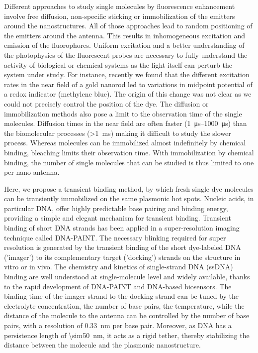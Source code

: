 Different approaches to study single molecules by fluorescence enhancement involve free diffusion, non-specific sticking or immobilization of the emitters around the nanostructures. All of those approaches lead to random positioning of the emitters around the antenna.\cite{pradhan2016goldnanorodenhanced,yuan2013thousandfold,zhang2017gold}
This results in inhomogeneous excitation and emission of the fluorophores.
Uniform excitation and a better understanding of the photophysics of the fluorescent probes are necessary to fully understand the activity of biological or chemical systems as the light itself can perturb the system under study.
For instance, recently we found that the different excitation rates in the near field of a gold nanorod led to variations in midpoint potential of a redox indicator (methylene blue). The origin of this change was not clear as we could not precisely control the position of the dye.\cite{zhang2017gold}
The diffusion or immobilization methods also pose a limit to the observation time of the single molecules.
Diffusion times in the near field are often faster (\SIrange{1}{1000}{\us}) than the biomolecular processes (\SI{>1}{\ms}) making it difficult to study the slower process.
Whereas molecules can be immobilized almost indefinitely by chemical binding, bleaching limits their observation time. With immobilization by chemical binding, the number of single molecules that can be studied is thus limited to one per nano-antenna.


Here, we propose a transient binding method, by which fresh single dye molecules can be transiently immobilized on the same plasmonic hot spots. Nucleic acids, in particular DNA, offer highly predictable base pairing and binding energy, providing a simple and elegant mechanism for transient binding. Transient binding of short DNA strands has been applied in a super-resolution imaging technique called DNA-PAINT.\cite{jungmann2010singlemolecule,lin2012submicrometre,schnitzbauer2017superresolution}
The necessary blinking required for super resolution is generated by the transient binding of the short dye-labeled DNA ('imager') to its complementary target ('docking') strands on the structure in vitro or in vivo.
The chemistry and kinetics of single-strand DNA (ssDNA) binding are well understood at single-molecule level and widely available, thanks to the rapid development of DNA-PAINT and DNA-based biosensors.\cite{sassolas2008dna,jungmann2010singlemolecule}
The binding time of the imager strand to the docking strand can be tuned by the electrolyte concentration, the number of base pairs, the temperature, while the distance of the molecule to the antenna can be controlled by the number of base pairs, with a resolution of \SI{0.33}{\nm} per base pair.
Moreover, as DNA has a persistence length of \SI{\sim50}{\nm}, it acts as a rigid tether, thereby stabilizing the distance between the molecule and the plasmonic nanostructure.\cite{manning2006the}



